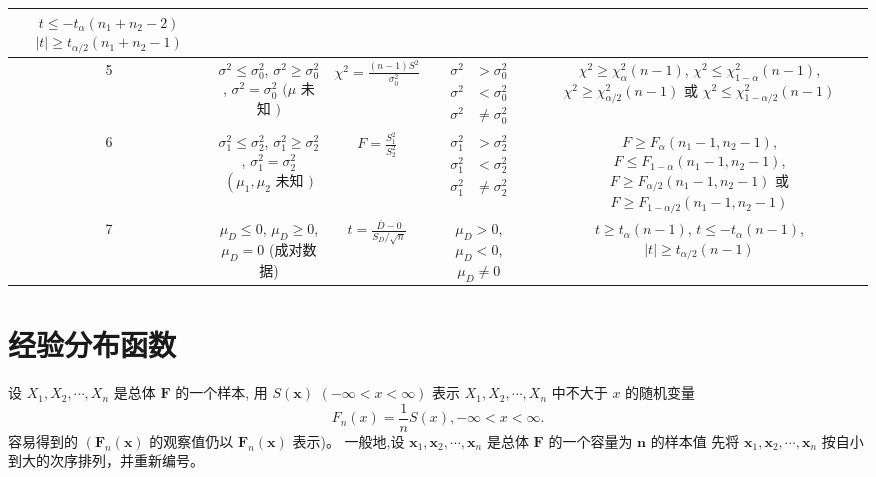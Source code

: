 \begin{table}[]
\begin{tabular}{c|c|c|c|c}
    $ t \leq-t_{\alpha}\left(n_{1}+n_{2}-2\right) $
    $ |t| \geq t_{\alpha / 2}\left(n_{1}+n_{2}-1\right) $ \\ \hline
    5 & $ \sigma^{2} \leq \sigma_{0}^{2} $,
    $ \sigma^{2} \geq \sigma_{0}^{2} $,
    $ \sigma^{2}=\sigma_{0}^{2} $
    $ (\mu $ 未知 $ ) $ & $ \chi^{2}=\frac{(n-1) S^{2}}{\sigma_{0}^{2}} $ & $ \begin{aligned} \sigma^{2} &>\sigma_{0}^{2} \\ \sigma^{2} &<\sigma_{0}^{2} \\ \sigma^{2} & \neq \sigma_{0}^{2} \end{aligned} $ & $ \chi^{2} \geq \chi_{\alpha}^{2}(n-1) $,
    $ \chi^{2} \leq \chi_{1-\alpha}^{2}(n-1) $,
    $ \chi^{2} \geq \chi_{\alpha / 2}^{2}(n-1) $ 或
    $ \chi^{2} \leq \chi_{1-\alpha / 2}^{2}(n-1) $ \\ \hline
    6 & $ \sigma_{1}^{2} \leq \sigma_{2}^{2} $,
    $ \sigma_{1}^{2} \geq \sigma_{2}^{2} $,
    $ \sigma_{1}^{2}=\sigma_{2}^{2} $
    $ \left(\mu_{1}, \mu_{2}\right. $ 未知 $ ) $ & $ F=\frac{S_{1}^{2}}{S_{2}^{2}} $ & $ \begin{aligned} \sigma_{1}^{2} &>\sigma_{2}^{2} \\ \sigma_{1}^{2} &<\sigma_{2}^{2} \\ \sigma_{1}^{2} & \neq \sigma_{2}^{2} \end{aligned} $ & $ F \geq F_{\alpha}\left(n_{1}-1, n_{2}-1\right) $,
    $ F \leq F_{1-\alpha}\left(n_{1}-1, n_{2}-1\right) $,
    $ F \geq F_{\alpha / 2}\left(n_{1}-1, n_{2}-1\right) $ 或
    $ F \geq F_{1-\alpha / 2}\left(n_{1}-1, n_{2}-1\right) $ \\ \hline
    7 & $ \mu_{D} \leq 0 $,
    $ \mu_{D} \geq 0 $,
    $ \mu_{D}=0 $
    (成对数据) & $ t=\frac{\bar{D}-0}{S_{D} / \sqrt{n}} $ & $ \mu_{D}>0 $,
    $ \mu_{D}<0 $,
    $ \mu_{D} \neq 0 $ &  $ t \geq t_{\alpha}(n-1) $,
    $ t \leq-t_{\alpha}(n-1) $,
    $ |t| \geq t_{\alpha / 2}(n-1) $
    \end{tabular}
\end{table}

\section{经验分布函数}

设 $ X_{1}, X_{2}, \cdots, X_{n} $ 是总体 $ \boldsymbol{F} $ 的一个样本, 用 $ S(\boldsymbol{x}) $
$ (-\infty<x<\infty) $ 表示 $ X_{1}, X_{2}, \cdots, X_{n} $ 中不大于 $ x $ 的随机变量
$$
F_{n}(x)=\frac{1}{n} S(x),-\infty<x<\infty .
$$
容易得到的 $ \left(\boldsymbol{F}_{n}(\boldsymbol{x})\right. $ 的观察值仍以 $ \boldsymbol{F}_{n}(\boldsymbol{x}) $ 表示)。
一般地,设 $ \boldsymbol{x}_{1}, \boldsymbol{x}_{2}, \cdots, \boldsymbol{x}_{n} $ 是总体 $ \boldsymbol{F} $ 的一个容量为 $ \boldsymbol{n} $ 的样本值
先将 $ \boldsymbol{x}_{1}, \boldsymbol{x}_{2}, \cdots, \boldsymbol{x}_{n} $ 按自小到大的次序排列，并重新编号。

